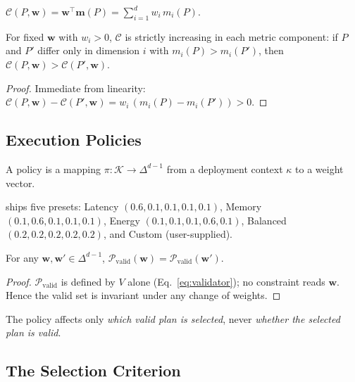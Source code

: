 \begin{definition}
$\mathcal{C}(P, \mathbf{w}) = \mathbf{w}^{\top} \mathbf{m}(P)
 = \sum_{i=1}^{d} w_i \, m_i(P)$.
\end{definition}

\begin{lemma}[Monotonicity]
\label{lem:monotonicity}
For fixed $\mathbf{w}$ with $w_i > 0$, $\mathcal{C}$ is strictly
increasing in each metric component: if $P$ and $P'$ differ only in
dimension $i$ with $m_i(P) > m_i(P')$, then
$\mathcal{C}(P, \mathbf{w}) > \mathcal{C}(P', \mathbf{w})$.
\end{lemma}

\begin{proof}
Immediate from linearity:
$\mathcal{C}(P,\mathbf{w}) - \mathcal{C}(P',\mathbf{w})
 = w_i \,(m_i(P) - m_i(P')) > 0$.
\end{proof}

\subsection{Execution Policies}

\begin{definition}
A policy is a mapping $\pi: \mathcal{K} \to \Delta^{d-1}$ from a
deployment context $\kappa$ to a weight vector.
\end{definition}

\gate{} ships five presets: Latency $(0.6,0.1,0.1,0.1,0.1)$, Memory
$(0.1,0.6,0.1,0.1,0.1)$, Energy $(0.1,0.1,0.1,0.6,0.1)$, Balanced
$(0.2,0.2,0.2,0.2,0.2)$, and Custom (user-supplied).

\begin{theorem}
\label{thm:policy-independence}
For any $\mathbf{w}, \mathbf{w}' \in \Delta^{d-1}$,
$\mathcal{P}_{\text{valid}}(\mathbf{w}) =
 \mathcal{P}_{\text{valid}}(\mathbf{w}')$.
\end{theorem}

\begin{proof}
$\mathcal{P}_{\text{valid}}$ is defined by $V$ alone
(Eq.~\ref{eq:validator}); no constraint reads $\mathbf{w}$. Hence the
valid set is invariant under any change of weights.
\end{proof}

The policy affects only \emph{which valid plan is selected}, never
\emph{whether the selected plan is valid}.

\subsection{The Selection Criterion}

